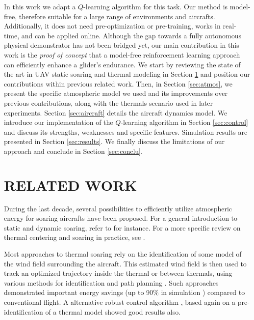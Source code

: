 \documentclass[a4paper, 10pt, conference]{ieeeconf}
\begin{document}
In this work we adapt a $Q$-learning \cite{watkins92qlearning} algorithm for this task. Our method is model-free, therefore suitable for a large range of environments and aircrafts. Additionally, it does not need pre-optimization or pre-training, works in real-time, and can be applied online. Although the gap towards a fully autonomous physical demonstrator has not been bridged yet, our main contribution in this work is the \emph{proof of concept} that a model-free reinforcement learning approach can efficiently enhance a glider's endurance.
We start by reviewing the state of the art in UAV static soaring and thermal modeling in Section \ref{sec:relwork} and position our contributions within previous related work. Then, in Section \ref{sec:atmos}, we present the specific atmospheric model we used and its improvements over previous contributions, along with the thermals scenario used in later experiments. Section \ref{sec:aircraft} details the aircraft dynamics model. We introduce our implementation of the $Q$-learning algorithm in Section \ref{sec:control} and discuss its strengths, weaknesses and specific features. Simulation results are presented in Section \ref{sec:results}. We finally discuss the limitations of our approach and conclude in Section \ref{sec:conclu}.

\section{RELATED WORK}
\label{sec:relwork}

During the last decade, several possibilities to efficiently utilize atmospheric energy for soaring aircrafts have been proposed. For a general introduction to static and dynamic soaring, refer to \cite{chen1981} for instance. For a more specific review on thermal centering and soaring in practice, see \cite{reichmann}.

Most approaches to thermal soaring rely on the identification of some model of the wind field surrounding the aircraft. This estimated wind field is then used to track an optimized trajectory inside the thermal or between thermals, using various methods for identification and path planning \cite{allen05,allen07,lawrance11,lawrance_phd,bencatel13,chen11,chakrabarty}. Such approaches demonstrated important energy savings (up to 90\% in simulation \cite{chakrabarty}) compared to conventional flight. A alternative robust control algorithm \cite{kahveci}, based again on a pre-identification of a thermal model showed good results also.
\end{document}
